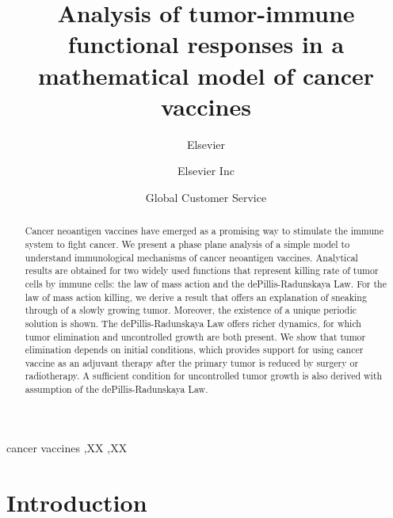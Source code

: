 \documentclass[review,authoryear]{elsarticle}
\begin{document}
\begin{frontmatter}

\title{Analysis of tumor-immune functional responses in a mathematical model
of cancer vaccines}


\author{Elsevier}
\address{Radarweg 29, Amsterdam}

\author[mymainaddress,mysecondaryaddress]{Elsevier Inc}

\author[mysecondaryaddress]{Global Customer Service}

\address[mymainaddress]{1600 John F Kennedy Boulevard, Philadelphia}
\address[mysecondaryaddress]{360 Park Avenue South, New York}

\begin{abstract}
Cancer neoantigen vaccines have emerged as a promising way to stimulate
the immune system to fight cancer. We present a phase plane analysis
of a simple model to understand immunological mechanisms of
cancer neoantigen vaccines. Analytical results are obtained for
two widely used functions that represent killing rate of tumor cells by immune cells:
the law of mass action and the dePillis-Radunskaya Law. For the law
of mass action killing, we derive a result that offers an
explanation of sneaking through of a slowly growing tumor. Moreover,
the existence of a unique periodic solution is shown. The dePillis-Radunskaya
Law offers richer dynamics, for which tumor elimination and uncontrolled growth are both present. We show that tumor elimination depends
on initial conditions, which provides support for using cancer vaccine
as an adjuvant therapy after the primary tumor is reduced by surgery
or radiotherapy. A sufficient condition for uncontrolled tumor growth 
is also derived with assumption of the dePillis-Radunskaya Law. 
\end{abstract}

\begin{keyword}
cancer vaccines \sep XX \sep XX
\end{keyword}

\end{frontmatter}

\linenumbers

\section{Introduction}
\end{document}
